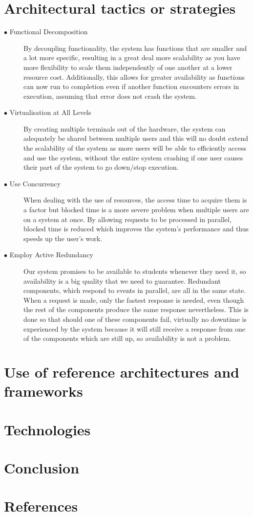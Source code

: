 \documentclass[12pt]{article}
\begin{document}
\section{Architectural tactics or strategies}
\begin{description}
  \item[$\bullet$ Functional Decomposition]
  By decoupling functionality, the system has functions that are smaller and a lot more specific, resulting in a great deal more scalability as you have more flexibility to scale them independently of one another at a lower resource cost. Additionally, this allows for greater availability as functions can now run to completion even if another function encounters errors in execution, assuming that error does not crash the system.
  \item[$\bullet$ Virtualisation at All Levels]
  By creating multiple terminals out of the hardware, the system can adequately be shared between multiple users and this will no doubt extend the scalability of the system as more users will be able to efficiently access and use the system, without the entire system crashing if one user causes their part of the system to go down/stop execution.
  \item[$\bullet$ Use Concurrency]
  When dealing with the use of resources, the access time to acquire them is a factor but blocked time is a more severe problem when multiple users are on a system at once. By allowing requests to be processed in parallel, blocked time is reduced which improves the system's performance and thus speeds up the user's work.
  \item[$\bullet$ Employ Active Redundancy]
  Our system promises to be available to students whenever they need it, so availability is a big quality that we need to guarantee.
  Redundant components, which respond to events in parallel, are all in the same state. When a request is made, only the fastest response is needed, even though the rest of the components produce the same response nevertheless. This is done so that should one of these components fail, virtually no downtime is experienced by the system because it will still receive a response from one of the components which are still up, so availability is not a problem. 
\end{description}

\section{Use of reference architectures and frameworks}

\section{Technologies}

\section{Conclusion}

\section{References}
\end{document}
